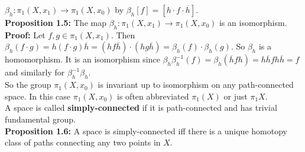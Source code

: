 \documentclass[a4paper]{article}
\begin{document}
$\beta_{h}  \colon \pi_1 (X, x_1) \to \pi_1 \left( X, x_0 \right) $ 
by $\beta_h \left[ f \right] = \left[ h \cdot f\cdot \overline{h} \right] $.\\
\linebreak
\textbf{Proposition 1.5:} The map $\beta_h  \colon \pi_1 (X, x_1) \to \pi_1 (X,
x_0)$ is an isomorphism.\\
\linebreak
\textbf{Proof:} Let $f,g \in \pi_1 \left( X, x_1 \right) $. Then
$\beta_h (f \cdot g) = h \left( f \cdot g\right) \overline{h} = 
(h f \overline{h}) \cdot  (h g \overline{h}) = \beta_h (f) \cdot \beta_h (g) $.
So
$\beta_h$ is a homomorphism. It is an isomorphism since
$\beta_h \beta_h^{-1} (f) = \beta_h \left( \overline{h}f h\right) =
h \overline{h}f h \overline{h}  = f$ and similarly for $\beta_h^{-1}\beta_h$.\\
\linebreak
So the group $ \pi_1 (X,x_0)$ is invariant up to isomorphism on any
path-connected space. In this case $\pi_1 (X,x_0)$ is often abbreviated
$\pi_1 (X)$ or just $\pi_1 X$.\\
\linebreak
A space is called \textbf{simply-connected} if it is path-connected and has
trivial fundamental group.\\
\textbf{Proposition 1.6:} A space is simply-connected iff there is a unique
homotopy class of paths connecting any two points in $X$.
\end{document}
